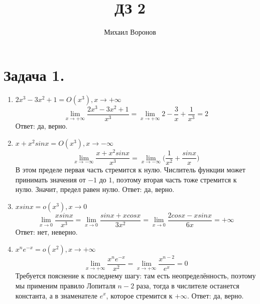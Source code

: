 \documentclass[a4paper,10pt]{article}
\title{ДЗ 2}
\author{Михаил Воронов}
\begin{document}
\maketitle

\section{Задача 1.}
\begin{enumerate}[label=(\alph*)]
 \item $2x^3 - 3x^2 + 1 = O(x^3), x \to +\infty$
  \begin{equation*}
   \lim_{x \to +\infty} \frac{2x^3 - 3x^2 + 1}{x^3} = 
   \lim_{x \to +\infty} 2 - \frac{3}{x} + \frac{1}{x^3} = 2
  \end{equation*}
  Ответ: да, верно.
 \item $x + x^2sinx = O(x^3), x \to -\infty$
  \begin{equation*}
   \lim_{x \to -\infty} \frac{x + x^2sinx}{x^3} =
   \lim_{x \to -\infty} \Big(\frac{1}{x^2} + \frac{sinx}{x}\Big)
  \end{equation*}
  В этом пределе первая часть стремится к нулю. Числитель функции может принимать значения от $-1$ до $1$, поэтому вторая часть тоже стремится к нулю. Значит, предел равен нулю.
  Ответ: да, верно.
  \item $xsinx = o(x^3), x \to 0$
  \begin{equation*}
   \lim_{x \to 0} \frac{xsinx}{x^3} = 
   \lim_{x \to 0} \frac{sinx + xcosx}{3x^2} = 
   \lim_{x \to 0} \frac{2cosx - xsinx}{6x} = +\infty
  \end{equation*}
  Ответ: нет, неверно.
  \item $x^ne^{-x} = o(x^2), x \to +\infty$
  \begin{equation*}
   \lim_{x \to +\infty} \frac{x^ne^{-x}}{x^2} = 
   \lim_{x \to +\infty} \frac{x^{n-2}}{e^x} = 0
  \end{equation*}
  Требуется пояснение к последнему шагу: там есть неопределённость, поэтому мы применим правило Лопиталя $n - 2$ раза, тогда в числителе останется константа, а в знаменателе $e^x$, которое стремится к $+\infty$.
  Ответ: да, верно.
\end{enumerate}
\end{document}

